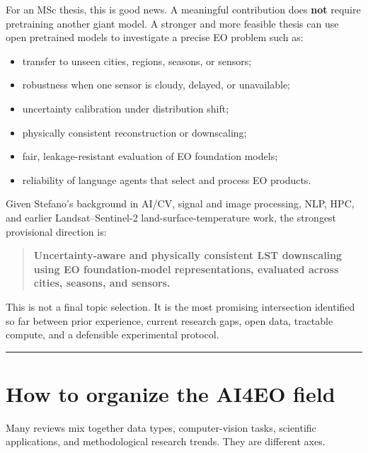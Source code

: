 \documentclass[
  a4paper,
  11pt]{article}
\providecommand{\tightlist}{%
  \setlength{\itemsep}{0pt}\setlength{\parskip}{0pt}}
\begin{document}
For an MSc thesis, this is good news. A meaningful contribution does
\textbf{not} require pretraining another giant model. A stronger and
more feasible thesis can use open pretrained models to investigate a
precise EO problem such as:

\begin{itemize}
\tightlist
\item
  transfer to unseen cities, regions, seasons, or sensors;
\item
  robustness when one sensor is cloudy, delayed, or unavailable;
\item
  uncertainty calibration under distribution shift;
\item
  physically consistent reconstruction or downscaling;
\item
  fair, leakage-resistant evaluation of EO foundation models;
\item
  reliability of language agents that select and process EO products.
\end{itemize}

Given Stefano's background in AI/CV, signal and image processing, NLP,
HPC, and earlier Landsat--Sentinel-2 land-surface-temperature work, the
strongest provisional direction is:

\begin{quote}
\textbf{Uncertainty-aware and physically consistent LST downscaling
using EO foundation-model representations, evaluated across cities,
seasons, and sensors.}
\end{quote}

This is not a final topic selection. It is the most promising
intersection identified so far between prior experience, current
research gaps, open data, tractable compute, and a defensible
experimental protocol.

\begin{center}\rule{0.5\linewidth}{0.5pt}\end{center}

\hypertarget{how-to-organize-the-ai4eo-field}{%
\section{How to organize the AI4EO
field}\label{how-to-organize-the-ai4eo-field}}

Many reviews mix together data types, computer-vision tasks, scientific
applications, and methodological research trends. They are different
axes.
\end{document}
